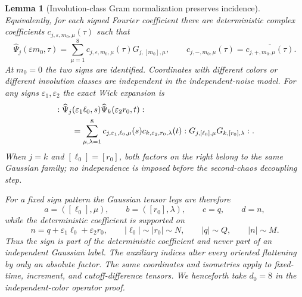 \documentclass[10pt]{amsart}
\numberwithin{equation}{section}
\theoremstyle{plain}
\newtheorem{lemma}[theorem]{Lemma}
\theoremstyle{definition}
\theoremstyle{remark}
\begin{document}
\begin{lemma}[Involution-class Gram normalization preserves incidence]
Equivalently, for each signed Fourier coefficient there are deterministic
complex coefficients $c_{j,\varepsilon,m_0,\mu}(\tau)$ such that
\begin{equation}\label{eq:signed-fourier-class-expansion}
        \widehat\Psi_j(\varepsilon m_0,\tau)
        =\sum_{\mu=1}^{8}
          c_{j,\varepsilon,m_0,\mu}(\tau)G_{j,[m_0],\mu},
        \qquad
        c_{j,-,m_0,\mu}(\tau)
        =\overline{c_{j,+,m_0,\mu}(\tau)}.
\end{equation}
At $m_0=0$ the two signs are identified.  Coordinates with different colors
or different involution classes are independent in the independent-noise
model.  For any signs $\varepsilon_1,\varepsilon_2$ the exact Wick expansion is
\begin{align}\label{eq:local-wick-coordinate-expansion}
&:\widehat\Psi_j(\varepsilon_1\ell_0,s)
  \widehat\Psi_k(\varepsilon_2r_0,t):
\notag\\
&\qquad=
\sum_{\mu,\lambda=1}^{8}
c_{j,\varepsilon_1,\ell_0,\mu}(s)
c_{k,\varepsilon_2,r_0,\lambda}(t)
:G_{j,[\ell_0],\mu}G_{k,[r_0],\lambda}: .
\end{align}
When $j=k$ and $[\ell_0]=[r_0]$, both factors on the right belong to the same
Gaussian family; no independence is imposed before the second-chaos
decoupling step.

For a fixed sign pattern the Gaussian tensor legs are therefore
\begin{equation}\label{eq:class-indexed-tensor-legs}
        a=([\ell_0],\mu),\qquad
        b=([r_0],\lambda),\qquad c=q,\qquad d=n,
\end{equation}
while the deterministic coefficient is supported on
\begin{equation}\label{eq:class-indexed-incidence}
        n=q+\varepsilon_1\ell_0+\varepsilon_2r_0,
        \qquad |\ell_0|\sim|r_0|\sim N,
        \qquad |q|\sim Q,
        \qquad |n|\sim M.
\end{equation}
Thus the sign is part of the deterministic coefficient and never part of an
independent Gaussian label.  The auxiliary indices alter every oriented
flattening by only an absolute factor.  The same coordinates and isometries
apply to fixed-time, increment, and cutoff-difference tensors.  We henceforth
take $d_0=8$ in the independent-color operator proof.
\end{lemma}
\end{document}
